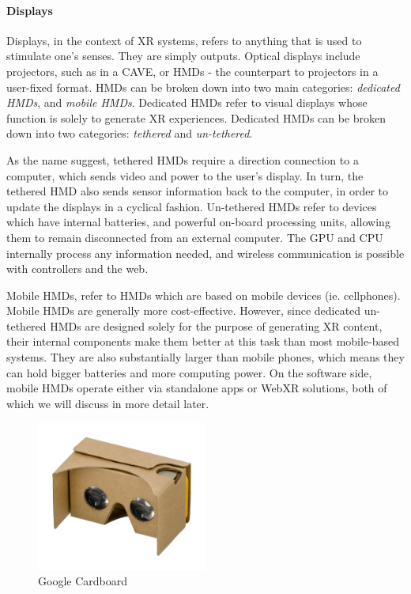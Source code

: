 
\paragraph{Displays}

Displays, in the context of XR systems, refers to anything that is used to stimulate one's senses. They are simply outputs. Optical displays include projectors, such as in a CAVE, or HMDs - the counterpart to projectors in a user-fixed format. HMDs can be broken down into two main categories: \textit{dedicated HMDs}, and \textit{mobile HMDs}. Dedicated HMDs refer to visual displays whose function is solely to generate XR experiences. Dedicated HMDs can be broken down into two categories: \textit{tethered} and \textit{un-tethered}. 

As the name suggest, tethered HMDs require a direction connection to a computer, which sends video and power to the user's display. In turn, the tethered HMD also sends sensor information back to the computer, in order to update the displays in a cyclical fashion. Un-tethered HMDs refer to devices which have internal batteries, and powerful on-board processing units, allowing them to remain disconnected from an external computer. The GPU and CPU internally process any information needed, and wireless communication is possible with controllers and the web. 

Mobile HMDs, refer to HMDs which are based on mobile devices (ie. cellphones). Mobile HMDs are generally more cost-effective. However, since dedicated un-tethered HMDs are designed solely for the purpose of generating XR content, their internal components make them better at this task than most mobile-based systems. They are also substantially larger than mobile phones, which means they can hold bigger batteries and more computing power. On the software side, mobile HMDs operate either via standalone apps or WebXR solutions, both of which we will discuss in more detail later. 

\begin{figure}[ht!]%
\centering
\includegraphics[width=0.5\textwidth]{img/cardboard.jpg} 
\caption{Google Cardboard \cite{FileGoog63online}}
\label{img:cardboard}
\end{figure}


